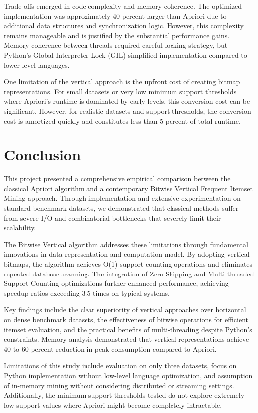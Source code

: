 \documentclass[conference]{IEEEtran}
\begin{document}
Trade-offs emerged in code complexity and memory coherence. The optimized implementation was approximately 40 percent larger than Apriori due to additional data structures and synchronization logic. However, this complexity remains manageable and is justified by the substantial performance gains. Memory coherence between threads required careful locking strategy, but Python's Global Interpreter Lock (GIL) simplified implementation compared to lower-level languages.

One limitation of the vertical approach is the upfront cost of creating bitmap representations. For small datasets or very low minimum support thresholds where Apriori's runtime is dominated by early levels, this conversion cost can be significant. However, for realistic datasets and support thresholds, the conversion cost is amortized quickly and constitutes less than 5 percent of total runtime.

\section{Conclusion}

This project presented a comprehensive empirical comparison between the classical Apriori algorithm and a contemporary Bitwise Vertical Frequent Itemset Mining approach. Through implementation and extensive experimentation on standard benchmark datasets, we demonstrated that classical methods suffer from severe I/O and combinatorial bottlenecks that severely limit their scalability.

The Bitwise Vertical algorithm addresses these limitations through fundamental innovations in data representation and computation model. By adopting vertical bitmaps, the algorithm achieves O(1) support counting operations and eliminates repeated database scanning. The integration of Zero-Skipping and Multi-threaded Support Counting optimizations further enhanced performance, achieving speedup ratios exceeding 3.5 times on typical systems.

Key findings include the clear superiority of vertical approaches over horizontal on dense benchmark datasets, the effectiveness of bitwise operations for efficient itemset evaluation, and the practical benefits of multi-threading despite Python's constraints. Memory analysis demonstrated that vertical representations achieve 40 to 60 percent reduction in peak consumption compared to Apriori.

Limitations of this study include evaluation on only three datasets, focus on Python implementation without low-level language optimization, and assumption of in-memory mining without considering distributed or streaming settings. Additionally, the minimum support thresholds tested do not explore extremely low support values where Apriori might become completely intractable.
\end{document}
